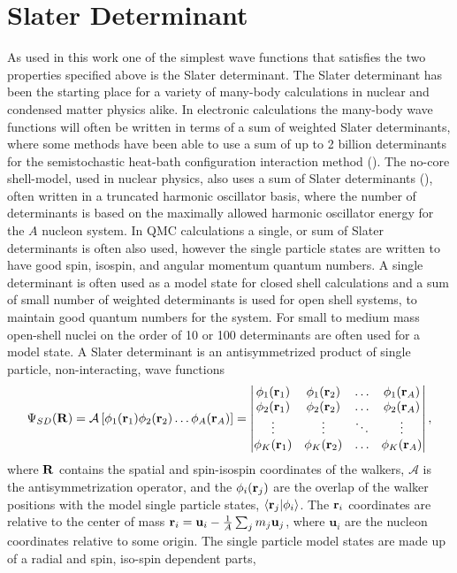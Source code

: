\section{Slater Determinant}
As used in this work one of the simplest wave functions that satisfies the two properties specified above is the Slater determinant. The Slater determinant has been the starting place for a variety of many-body calculations in nuclear and condensed matter physics alike. In electronic calculations the many-body wave functions will often be written in terms of a sum of weighted Slater determinants, where some methods have been able to use a sum of up to 2 billion determinants for the semistochastic heat-bath configuration interaction method (\cite{huron1973,li2018}). The no-core shell-model, used in nuclear physics, also uses a sum of Slater determinants (\cite{navratil2009,barrett2013}), often written in a truncated harmonic oscillator basis, where the number of determinants is based on the maximally allowed harmonic oscillator energy for the $A$ nucleon system. In QMC calculations a single, or sum of Slater determinants is often also used, however the single particle states are written to have good spin, isospin, and angular momentum quantum numbers. A single determinant is often used as a model state for closed shell calculations and a sum of small number of weighted determinants is used for open shell systems, to maintain good quantum numbers for the system. For small to medium mass open-shell nuclei on the order of 10 or 100 determinants are often used for a model state. A Slater determinant is an antisymmetrized product of single particle, non-interacting, wave functions
\begin{equation}
   \Psi_{SD}(\mathbf{R}) = \mathcal{A} \left[\phi_1(\mathbf{r}_1)\phi_2(\mathbf{r}_2) \ldots \phi_A(\mathbf{r}_A)\right] =
   \begin{vmatrix}
      \phi_1(\mathbf{r}_1) & \phi_1(\mathbf{r}_2) & \ldots & \phi_1(\mathbf{r}_A) \\
      \phi_2(\mathbf{r}_1) & \phi_2(\mathbf{r}_2) & \ldots & \phi_2(\mathbf{r}_A) \\
      \vdots & \vdots & \ddots & \vdots \\
      \phi_K(\mathbf{r}_1) & \phi_K(\mathbf{r}_2) & \ldots & \phi_K(\mathbf{r}_A) \\
   \end{vmatrix},
\end{equation}
where $\mathbf{R}$ contains the spatial and spin-isospin coordinates of the walkers, $\mathcal{A}$ is the antisymmetrization operator, and the $\phi_i(\mathbf{r}_j)$ are the overlap of the walker positions with the model single particle states, $\left< \mathbf{r}_j | \phi_i \right>$. The $\mathbf{r}_i$ coordinates are relative to the center of mass $\mathbf{r}_i = \mathbf{u}_i - \frac{1}{A}\sum_jm_j\mathbf{u}_j$, where $\mathbf{u}_i$ are the nucleon coordinates relative to some origin. The single particle model states are made up of a radial and spin, iso-spin dependent parts,
